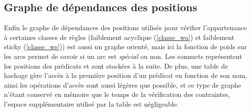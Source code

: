 \subsection{Graphe de dépendances des positions}
Enfin le graphe de dépendances des positions utilisés pour vérifier l'appartenance à
certaines classes de règles (faiblement acyclique (\ref{classe_wa}) et faiblement sticky
(\ref{classe_ws})) est aussi un graphe orienté, mais ici la fonction de poids sur les
arcs permet de savoir si un arc est {\em spécial} ou non.
Les sommets représentent
les positions des prédicats et sont stockées à la suite. De plus, une table de hachage gère
l'accès à la première position d'un prédicat en fonction de son nom, 
ainsi les opérations d'accès sont
aussi légères que possible, et ce type de graphe n'étant conservé en mémoire que le
temps de la vérification des contraintes, l'espace supplémentaire utilisé par la table est
négligeable.

